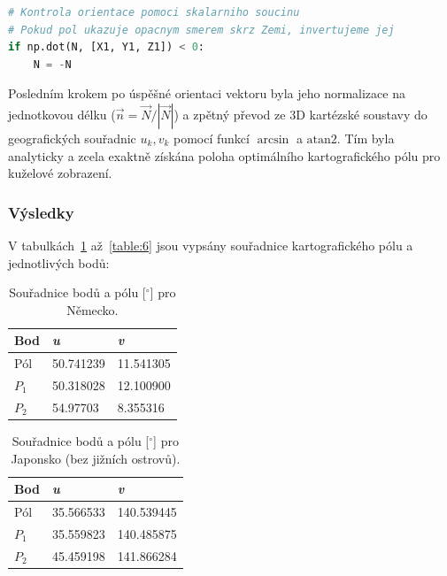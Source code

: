 \begin{lstlisting}[language=Python, caption=Korekce směru pólu pomocí skalárního součinu.]
# Kontrola orientace pomoci skalarniho soucinu
# Pokud pol ukazuje opacnym smerem skrz Zemi, invertujeme jej
if np.dot(N, [X1, Y1, Z1]) < 0:
    N = -N
\end{lstlisting}

Posledním krokem po úspěšné orientaci vektoru byla jeho normalizace na jednotkovou délku ($\vec{n} = \vec{N} / |\vec{N}|$) a zpětný převod ze 3D kartézské soustavy do geografických souřadnic $u_k, v_k$ pomocí  funkcí $\arcsin$ a $\text{atan2}$. Tím byla analyticky a zcela exaktně získána poloha optimálního kartografického pólu pro kuželové zobrazení.

\subsubsection*{Výsledky}
V tabulkách~\ref{table:4} až~\ref{table:6}  jsou vypsány souřadnice kartografického pólu a jednotlivých bodů:

    \begin{table}[h!]
        \centering
        \begin{tabular}{|p{3cm}|p{3cm}|p{3cm}|} 
         \hline
            Bod & \textit{u}  & \textit{v} \\
            \hline
            Pól  &   50.741239 & 11.541305 \\
            \hline
            $P_1$   &  50.318028 &  12.100900\\
            \hline
            $P_2$   &  54.97703 & 8.355316 \\
            \hline
        \end{tabular}
        \caption{Souřadnice bodů a pólu [$^\circ$] pro Německo.}
\label{table:4}
    \end{table}


    \begin{table}[h!]
        \centering
        \begin{tabular}{|p{3cm}|p{3cm}|p{3cm}|} 
         \hline
            Bod & \textit{u}  & \textit{v} \\
            \hline
            Pól  &    35.566533  & 140.539445 \\
            \hline
            $P_1$   &  35.559823 &  140.485875 \\
            \hline
            $P_2$   &  45.459198 & 141.866284\\
            \hline
         
        \end{tabular}
        \caption{Souřadnice bodů a pólu [$^\circ$] pro Japonsko (bez jižních ostrovů).}
\label{table:5}
    \end{table}



